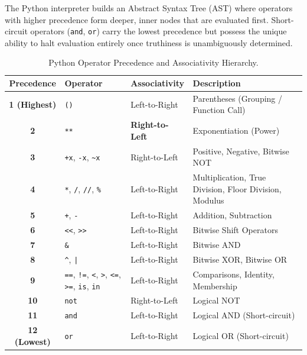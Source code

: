 The Python interpreter builds an Abstract Syntax Tree (AST) where operators with higher precedence form deeper, inner nodes that are evaluated first. Short-circuit operators (\texttt{and}, \texttt{or}) carry the lowest precedence but possess the unique ability to halt evaluation entirely once truthiness is unambiguously determined.

\begin{table}[htbp]
\centering
\small
\renewcommand{\arraystretch}{1.2}
\begin{tabularx}{\linewidth}{cll>{\raggedright\arraybackslash}X}
\toprule
\textbf{Precedence} & \textbf{Operator} & \textbf{Associativity} & \textbf{Description} \\
\midrule
\textbf{1 (Highest)} & \texttt{()} & Left-to-Right & Parentheses (Grouping / Function Call) \\
\textbf{2} & \texttt{**} & \textbf{Right-to-Left} & Exponentiation (Power) \\
\textbf{3} & \texttt{+x}, \texttt{-x}, \texttt{\textasciitilde x} & Right-to-Left & Positive, Negative, Bitwise NOT \\
\textbf{4} & \texttt{*}, \texttt{/}, \texttt{//}, \texttt{\%} & Left-to-Right & Multiplication, True Division, Floor Division, Modulus \\
\textbf{5} & \texttt{+}, \texttt{-} & Left-to-Right & Addition, Subtraction \\
\textbf{6} & \texttt{<<}, \texttt{>>} & Left-to-Right & Bitwise Shift Operators \\
\textbf{7} & \texttt{\&} & Left-to-Right & Bitwise AND \\
\textbf{8} & \texttt{\textasciicircum}, \texttt{|} & Left-to-Right & Bitwise XOR, Bitwise OR \\
\textbf{9} & \texttt{==}, \texttt{!=}, \texttt{<}, \texttt{>}, \texttt{<=}, \texttt{>=}, \texttt{is}, \texttt{in} & Left-to-Right & Comparisons, Identity, Membership \\
\textbf{10} & \texttt{not} & Right-to-Left & Logical NOT \\
\textbf{11} & \texttt{and} & Left-to-Right & Logical AND (Short-circuit) \\
\textbf{12 (Lowest)} & \texttt{or} & Left-to-Right & Logical OR (Short-circuit) \\
\bottomrule
\end{tabularx}
\caption{Python Operator Precedence and Associativity Hierarchy.}
\label{tab:master-operators}
\end{table}

